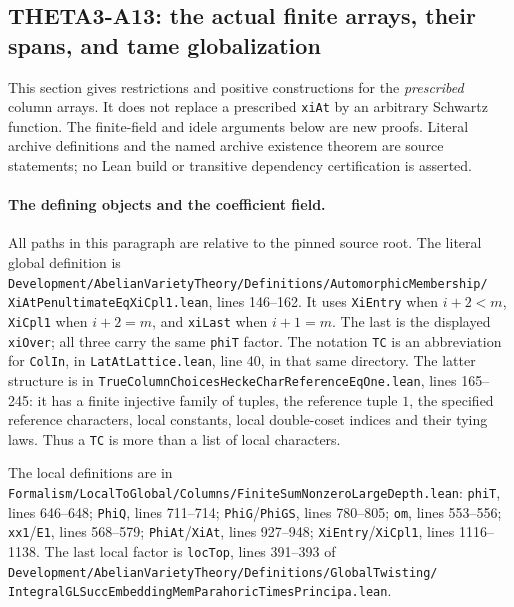 \subsection{THETA3-A13: the actual finite arrays, their spans, and tame globalization}
\label{A13}

This section gives restrictions and positive constructions for the
\emph{prescribed} column arrays.  It does not replace a prescribed
\texttt{xiAt} by an arbitrary Schwartz function.  The finite-field and
idele arguments below are new proofs.  Literal archive definitions and
the named archive existence theorem are source statements; no Lean
build or transitive dependency certification is asserted.

\paragraph{The defining objects and the coefficient field.}
All paths in this paragraph are relative to the pinned source root.
The literal global definition is
\texttt{Development/AbelianVarietyTheory/Definitions/AutomorphicMembership/}
\texttt{XiAtPenultimateEqXiCpl1.lean}, lines 146--162.
It uses \texttt{XiEntry} when $i+2<m$, \texttt{XiCpl1}
when $i+2=m$, and \texttt{xiLast} when $i+1=m$.
The last is the displayed \texttt{xiOver}; all three carry
the same \texttt{phiT} factor.
The notation \texttt{TC} is an abbreviation for \texttt{ColIn},
in \texttt{LatAtLattice.lean}, line 40, in that same directory.
The latter structure is in
\texttt{TrueColumnChoicesHeckeCharReferenceEqOne.lean},
lines 165--245: it has a finite injective family of tuples,
the reference tuple $1$, the specified reference characters,
local constants, local double-coset indices and their tying laws.
Thus a \texttt{TC} is more than a list of local characters.

The local definitions are in
\texttt{Formalism/LocalToGlobal/Columns/FiniteSumNonzeroLargeDepth.lean}:
\texttt{phiT}, lines 646--648;
\texttt{PhiQ}, lines 711--714;
\texttt{PhiG}/\texttt{PhiGS}, lines 780--805;
\texttt{om}, lines 553--556;
\texttt{xx1}/\texttt{E1}, lines 568--579;
\texttt{PhiAt}/\texttt{XiAt}, lines 927--948;
\texttt{XiEntry}/\texttt{XiCpl1}, lines 1116--1138.
The last local factor is \texttt{locTop}, lines 391--393 of
\texttt{Development/AbelianVarietyTheory/Definitions/GlobalTwisting/}
\texttt{IntegralGLSuccEmbeddingMemParahoricTimesPrincipa.lean}.

